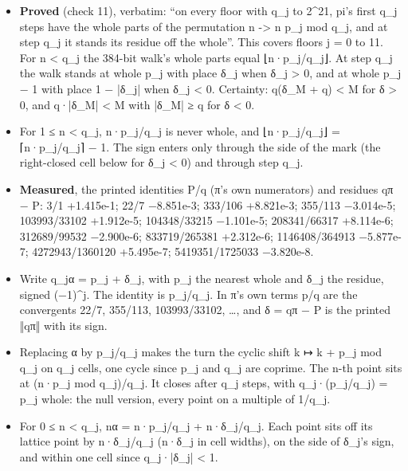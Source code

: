 \begin{itemize}
\begin{itemize}
\item \textbf{Proved} (check 11), verbatim: “on every floor with q\_\allowbreak{}j to 2\textasciicircum{}21, pi's first q\_\allowbreak{}j steps have the whole parts of the permutation n -> n p\_\allowbreak{}j mod q\_\allowbreak{}j, and at step q\_\allowbreak{}j it stands its residue off the whole”. This covers floors j = 0 to 11. For n < q\_\allowbreak{}j the 384-bit walk's whole parts equal ⌊n·p\_\allowbreak{}j/q\_\allowbreak{}j⌋. At step q\_\allowbreak{}j the walk stands at whole p\_\allowbreak{}j with place δ\_\allowbreak{}j when δ\_\allowbreak{}j > 0, and at whole p\_\allowbreak{}j − 1 with place 1 − |δ\_\allowbreak{}j| when δ\_\allowbreak{}j < 0. Certainty: q(δ\_\allowbreak{}M + q) < M for δ > 0, and q·|δ\_\allowbreak{}M| < M with |δ\_\allowbreak{}M| ≥ q for δ < 0.
\item For 1 ≤ n < q\_\allowbreak{}j, n·p\_\allowbreak{}j/q\_\allowbreak{}j is never whole, and ⌊n·p\_\allowbreak{}j/q\_\allowbreak{}j⌋ = ⌈n·p\_\allowbreak{}j/q\_\allowbreak{}j⌉ − 1. The sign enters only through the side of the mark (the right-closed cell below for δ\_\allowbreak{}j < 0) and through step q\_\allowbreak{}j.
\item \textbf{Measured}, the printed identities P/q (π's own numerators) and residues qπ − P: 3/1 +1.415e-1; 22/7 −8.851e-3; 333/106 +8.821e-3; 355/113 −3.014e-5; 103993/33102 +1.912e-5; 104348/33215 −1.101e-5; 208341/66317 +8.114e-6; 312689/99532 −2.900e-6; 833719/265381 +2.312e-6; 1146408/364913 −5.877e-7; 4272943/1360120 +5.495e-7; 5419351/1725033 −3.820e-8.
\item Write q\_\allowbreak{}jα = p\_\allowbreak{}j + δ\_\allowbreak{}j, with p\_\allowbreak{}j the nearest whole and δ\_\allowbreak{}j the residue, signed (−1)\textasciicircum{}j. The identity is p\_\allowbreak{}j/q\_\allowbreak{}j. In π's own terms p/q are the convergents 22/7, 355/113, 103993/33102, …, and δ = qπ − P is the printed ‖qπ‖ with its sign.
\item Replacing α by p\_\allowbreak{}j/q\_\allowbreak{}j makes the turn the cyclic shift k ↦ k + p\_\allowbreak{}j mod q\_\allowbreak{}j on q\_\allowbreak{}j cells, one cycle since p\_\allowbreak{}j and q\_\allowbreak{}j are coprime. The n-th point sits at (n·p\_\allowbreak{}j mod q\_\allowbreak{}j)/q\_\allowbreak{}j. It closes after q\_\allowbreak{}j steps, with q\_\allowbreak{}j·(p\_\allowbreak{}j/q\_\allowbreak{}j) = p\_\allowbreak{}j whole: the null version, every point on a multiple of 1/q\_\allowbreak{}j.
\item For 0 ≤ n < q\_\allowbreak{}j, nα = n·p\_\allowbreak{}j/q\_\allowbreak{}j + n·δ\_\allowbreak{}j/q\_\allowbreak{}j. Each point sits off its lattice point by n·δ\_\allowbreak{}j/q\_\allowbreak{}j (n·δ\_\allowbreak{}j in cell widths), on the side of δ\_\allowbreak{}j's sign, and within one cell since q\_\allowbreak{}j·|δ\_\allowbreak{}j| < 1.

\end{itemize}
\end{itemize}
